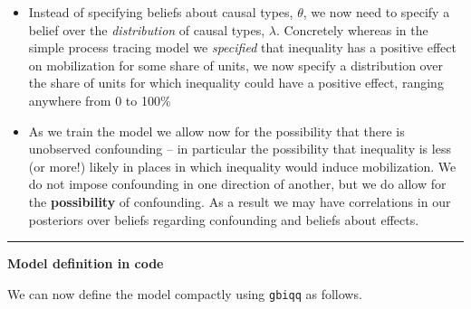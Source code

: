 \documentclass[12pt,]{book}
\newenvironment{Shaded}{\begin{snugshade}}{\end{snugshade}}
\newcommand{\DataTypeTok}[1]{\textcolor[rgb]{0.13,0.29,0.53}{#1}}
\newcommand{\KeywordTok}[1]{\textcolor[rgb]{0.13,0.29,0.53}{\textbf{#1}}}
\newcommand{\NormalTok}[1]{#1}
\newcommand{\OperatorTok}[1]{\textcolor[rgb]{0.81,0.36,0.00}{\textbf{#1}}}
\newcommand{\StringTok}[1]{\textcolor[rgb]{0.31,0.60,0.02}{#1}}
\begin{document}
\begin{itemize}
\item
  Instead of specifying beliefs about causal types, \(\theta\), we now need to specify a belief over the \emph{distribution} of causal types, \(\lambda\). Concretely whereas in the simple process tracing model we \emph{specified} that inequality has a positive effect on mobilization for some share of units, we now specify a distribution over the share of units for which inequality could have a positive effect, ranging anywhere from 0 to 100\%
\item
  As we train the model we allow now for the possibility that there is unobserved confounding -- in particular the possibility that inequality is less (or more!) likely in places in which inequality would induce mobilization. We do not impose confounding in one direction of another, but we do allow for the \textbf{possibility} of confounding. As a result we may have correlations in our posteriors over beliefs regarding confounding and beliefs about effects.
\end{itemize}

\begin{center}\rule{0.5\linewidth}{\linethickness}\end{center}

\textbf{Model definition in code}

We can now define the model compactly using \texttt{gbiqq} as follows.

\begin{Shaded}
\end{Shaded}
\end{document}
